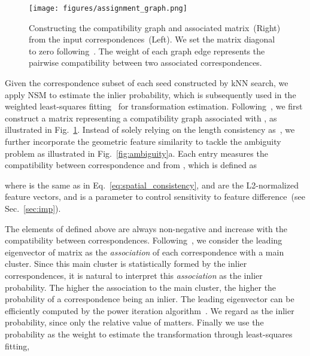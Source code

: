 \begin{figure}[tb]
\setlength{\belowcaptionskip}{-0.35cm}
	\centering
	\vspace{-0.5cm}
    \texttt{[image: figures/assignment\_graph.png]}
    \caption{Constructing the compatibility graph {and associated matrix~(Right)} from the input correspondences~(Left). We set the matrix diagonal to zero following~\cite{leordeanu2005spectral}.
The weight of each graph edge represents the pairwise compatibility between two {associated} correspondences. } 
    \label{fig:assignment_graph}
\end{figure}

Given the correspondence subset  of each seed constructed by kNN search, we apply NSM to estimate the inlier probability, which is subsequently used in the weighted least-squares
fitting~\cite{besl1992method} for transformation estimation.  Following~\cite{leordeanu2005spectral}, we first construct a matrix  representing a compatibility graph associated with , 
as illustrated in Fig.~\ref{fig:assignment_graph}. Instead of solely relying on the length consistency as~\cite{leordeanu2005spectral}, {we further incorporate the geometric feature similarity to tackle the ambiguity problem}
as illustrated in Fig.~\ref{fig:ambiguity}a. Each entry  measures the compatibility between correspondence  and  from , which is defined as 


where  is {the same as} in Eq.~\ref{eq:spatial_consistency},
 and  are the L2-normalized feature vectors, and  is a parameter to control sensitivity to {feature difference~(see Sec.~\ref{sec:imp}).} 


 
  
 The elements of  defined above {are} always non-negative and increase with the compatibility between correspondences. Following~\cite{leordeanu2005spectral}, we consider the leading eigenvector of matrix  as the \textit{association} of each correspondence with {a} main cluster. Since this main cluster is statistically formed by the inlier correspondences, it is natural to interpret this \textit{association} as the inlier probability. The higher the association to the main cluster, the higher the probability of {a correspondence} being an inlier.
The leading eigenvector  can be efficiently computed by the power iteration algorithm~\cite{mises1929praktische}. 
We regard   
as the inlier probability, since only the relative value of  matters.
{Finally} we use the probability  as the weight to estimate the transformation through {least-squares fitting},

